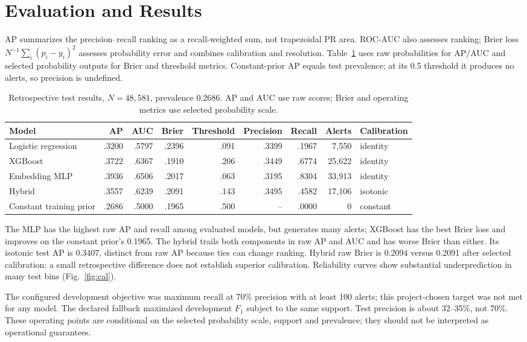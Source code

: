 \documentclass[conference]{IEEEtran}
\begin{document}
\section{Evaluation and Results}
AP summarizes the precision--recall ranking as a recall-weighted sum, not trapezoidal PR area. ROC-AUC also assesses ranking; Brier loss $N^{-1}\sum_i(p_i-y_i)^2$ assesses probability error and combines calibration and resolution. Table~\ref{tab:results} uses raw probabilities for AP/AUC and selected probability outputs for Brier and threshold metrics. Constant-prior AP equals test prevalence; at its 0.5 threshold it produces no alerts, so precision is undefined.
\begin{table}[t]\caption{Retrospective test results, $N=48{,}581$, prevalence 0.2686. AP and AUC use raw scores; Brier and operating metrics use selected probability scale.}\label{tab:results}\centering\small\begin{tabular}{lrrrrrrrl}\toprule Model & AP & AUC & Brier & Threshold & Precision & Recall & Alerts & Calibration\\\midrule Logistic regression & .3200 & .5797 & .2396 & .091 & .3399 & .1967 & 7,550 & identity\\ XGBoost & .3722 & .6367 & .1910 & .206 & .3449 & .6774 & 25,622 & identity\\ Embedding MLP & .3936 & .6506 & .2017 & .063 & .3195 & .8304 & 33,913 & identity\\ Hybrid & .3557 & .6239 & .2091 & .143 & .3495 & .4582 & 17,106 & isotonic\\ Constant training prior & .2686 & .5000 & .1965 & .500 & -- & .0000 & 0 & constant\\\bottomrule\end{tabular}\end{table}
The MLP has the highest raw AP and recall among evaluated models, but generates many alerts; XGBoost has the best Brier loss and improves on the constant prior's 0.1965. The hybrid trails both components in raw AP and AUC and has worse Brier than either. Its isotonic test AP is 0.3407, distinct from raw AP because ties can change ranking. Hybrid raw Brier is 0.2094 versus 0.2091 after selected calibration: a small retrospective difference does not establish superior calibration. Reliability curves show substantial underprediction in many test bins (Fig.~\ref{fig:cal}).

The configured development objective was maximum recall at 70\% precision with at least 100 alerts; this project-chosen target was not met for any model. The declared fallback maximized development $F_1$ subject to the same support. Test precision is about 32--35\%, not 70\%. These operating points are conditional on the selected probability scale, support and prevalence; they should not be interpreted as operational guarantees.
\end{document}
